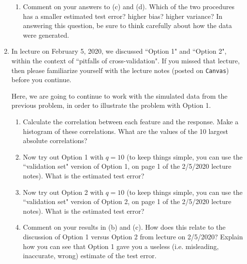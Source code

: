 \documentclass[12pt]{article}
\begin{document}
\begin{enumerate}
\begin{enumerate}
\item Comment on your answers to (c) and (d). Which of the two procedures has a smaller estimated test error?  higher bias? higher variance? In answering this question, be sure to think carefully about how the data were generated.

\end{enumerate}



\item In lecture on February 5, 2020, we discussed ``Option 1" and ``Option 2", within the context of ``pitfalls of cross-validation". If you missed that lecture, then please familiarize yourself with the lecture notes (posted on \verb=Canvas=) before you continue.

Here, we are going to continue to work with the simulated data from the previous problem, in order to illustrate the problem with Option 1. 

\begin{enumerate}

\item Calculate the correlation between each feature and the response. Make a histogram of these correlations. What are the  values of the 10 largest absolute correlations? 

\item Now try out Option 1 with $q=10$ (to keep things simple, you can use the ``validation set" version of Option 1, on page 1 of the 2/5/2020 lecture notes). What is the estimated test error?

\item Now try out Option 2 with $q=10$ (to keep things simple, you can use the ``validation set" version of Option 2, on page 1 of the 2/5/2020 lecture notes). What is the estimated test error? 

\item Comment on your results in (b) and (c). How does this relate to the discussion of Option 1 versus Option 2  from lecture on 2/5/2020? Explain how you can see that Option 1 gave you a useless (i.e. misleading, inaccurate, wrong) estimate of the test error. 
\end{enumerate}



\end{enumerate}
\end{document}
